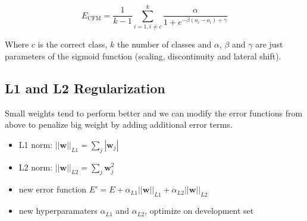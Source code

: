 \begin{equation}\label{eq:cfm}
E_{\text{CFM}} = \frac{1}{k-1} \sum_{i=1,i\neq c}^k \frac{\alpha}{1+e^{-\beta (o_c - o_i) + \gamma}}
\end{equation}

Where $c$ is the correct class, $k$ the number of classes and $\alpha$, $\beta$ and $\gamma$ are just parameters of the sigmoid function (scaling, discontinuity and lateral shift).

\subsection{L1 and L2 Regularization}
Small weights tend to perform better and we can modify the error functions from above to penalize big weight by adding additional error terms.
\begin{itemize}
\item L1 norm: $||\mathbf{w}||_{L1} = \sum_j |\mathbf{w}_j|$
\item L2 norm: $||\mathbf{w}||_{L2} = \sum_j \mathbf{w}_j^2$
\item new error function $E' = E + \alpha_{L1} ||\mathbf{w}||_{L1} + \alpha_{L2} ||\mathbf{w}||_{L2}$
\item new hyperparamaters $\alpha_{L1}$ and $\alpha_{L2}$, optimize on development set
\end{itemize}

